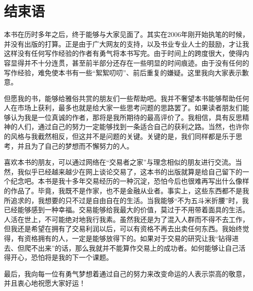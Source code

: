 \section{结束语}

本书在历时多年之后，终于能够与大家见面了。其实在2006年刚开始执笔的时候，并没有出版的打算。正是由于广大网友的支持，以及书业专业人士的鼓励，才让我这样没有任何写作经验的作者有勇气将本书写完。由于时间上的跨度很大，使得内容显得并不十分连贯，甚至前半部分还存在一些明显的时间痕迹。由于没有任何的写作经验，难免使本书有一些“絮絮叨叨”、前后重复的嫌疑。这里我向大家表示歉意。

但愿我的书，能够给雅俗共赏的朋友们一些帮助吧。我并不奢望本书能够帮助任何人在市场上获利，最多也就是给大家一些思考问题的思路罢了。如果读者朋友们能够认为我是一位真诚的作者，那将是我所期待的最高评价了。我相信，具有反思精神的人们，通过自己的努力一定能够找到一条适合自己的获利之路。当然，也许你的风格与我截然相反，但这并不是问题的关键。关键的是，我们同样都是乐于思考，并且为了自己的梦想而不懈努力的人。

喜欢本书的朋友，可以通过网络在“交易者之家”与理念相似的朋友进行交流。当然，我似乎已经越来越少在网上谈论交易了，这本书的出版就算是给自己留下的一个纪念吧。本书是我十多年交易经历的一种沉淀，恐怕今后也很难再写出什么像样的作品了。毕竟，我既不是作家，也不是金融从业者。事实上，这些东西都不是我所追求的，我想要的只不过是自由自在的生活。当我能够“不为五斗米折腰”时，我已经能够感到一种幸福。交易能够给我最大的价值，莫过于不用带着面具的生活。人活在世上，不可能绝对地我行我素。虽然我还是为了混入人群而不得不去工作，但我还是希望在拥有了交易利润以后，可以有资格不再去出卖任何东西。我始终觉得，有资格拥有的人，一定是能够放得下的。如果对于交易的研究让我“钻得进去、但爬不出来”的话，那么我就并不能算作交易上的成功者。如何能够让自己活得开心，恐怕将是我的下一个课题。

最后，我向每一位有勇气梦想着通过自己的努力来改变命运的人表示崇高的敬意，并且衷心地祝愿大家好运！
